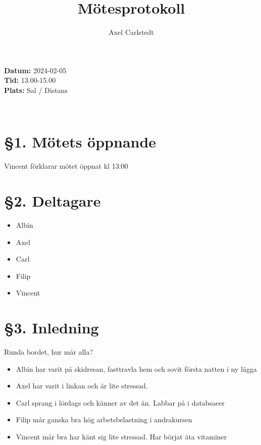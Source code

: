 \documentclass[a4paper, 11pt]{article}
\title{Mötesprotokoll}
\author{Axel Carlstedt}
\begin{document}
\pagestyle{style1}


\textbf{Datum:} 2024-02-05\\
\textbf{Tid:} 13.00-15.00\\
\textbf{Plats:} Sal / Distans

\makebox[\linewidth]{\rule{\linewidth}{0.4pt}}\\

\section*{§1. Mötets öppnande}
Vincent förklarar mötet öppnat kl 13:00

\section*{§2. Deltagare}
\begin{itemize}
    \item Albin
    \item Axel
    \item Carl
    \item Filip
    \item Vincent
\end{itemize}


\section*{§3. Inledning}
Runda bordet, hur mår alla?
\begin{itemize}
    \item Albin har varit på skidresan, fasttravla hem och sovit första natten i ny lägga
    \item Axel har varit i linkan och är lite stressad.
    \item Carl sprang i lördags och känner av det än. Labbar på i databsaeer
    \item Filip mår ganska bra hög arbetsbelastning i andrakursen 
    \item Vincent mår bra har känt sig lite stressad. Har börjat äta vitaminer 
\end{itemize}
\end{document}
